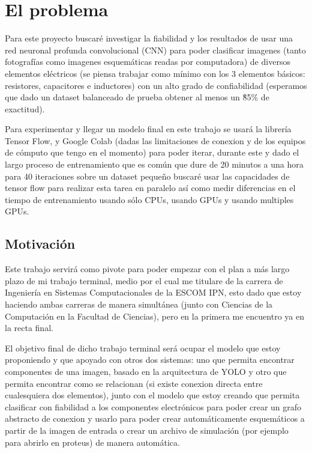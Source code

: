 \documentclass[10pt, fleqn, journal]{IEEEtran}
\theoremstyle{break}                                            %
\begin{document}
  \section{El problema}
    
    Para este proyecto buscaré investigar la fiabilidad y los resultados de usar una red neuronal profunda 
    convolucional  (CNN) para poder clasificar imagenes (tanto fotografías como imagenes esquemáticas 
    readas por computadora) de diversos elementos eléctricos (se piensa trabajar como mínimo con los 
    3 elementos básicos: resistores, capacitores e inductores) con un alto grado de confiabilidad 
    (esperamos que dado un dataset balanceado de prueba obtener al menos un \~85\% de exactitud).

    Para experimentar y llegar un modelo final en este trabajo se usará la librería Tensor Flow, y 
    Google Colab (dadas las limitaciones de conexion y de los equipos de cómputo que tengo en el momento) 
    para poder iterar, durante este y dado el largo proceso de entrenamiento que es común que dure de 20
    minutos a una hora para 40 iteraciones sobre un dataset pequeño buscaré usar las capacidades de 
    tensor flow para realizar esta tarea en paralelo así como medir diferencias en el tiempo de
    entrenamiento usando sólo CPUs, usando GPUs y usando multiples GPUs.
    
    \subsection{Motivación}
    
      Este trabajo servirá como pivote para poder empezar con el plan a más largo plazo de mi trabajo 
      terminal, medio por el cual me titulare de la carrera de Ingeniería en Sistemas Computacionales 
      de la ESCOM IPN, esto dado que estoy haciendo ambas carreras de manera simultánea (junto con 
      Ciencias de la Computación en la Facultad de Ciencias), pero en la primera me encuentro 
      ya en la recta final.

      El objetivo final de dicho trabajo terminal será ocupar el modelo que estoy proponiendo y que 
      apoyado con otros dos sistemas: uno que permita encontrar componentes de una imagen, basado en 
      la arquitectura de YOLO y otro que permita encontrar como se relacionan (si existe conexion 
      directa entre cualesquiera dos elementos), junto con el modelo que estoy creando que permita 
      clasificar con fiabilidad a los componentes electrónicos para poder crear un grafo abstracto 
      de conexion y usarlo para poder crear automáticamente esquemáticos a partir de la imagen de 
      entrada o crear un archivo de simulación (por ejemplo para abrirlo en proteus) 
      de manera automática.
    
\end{document}
